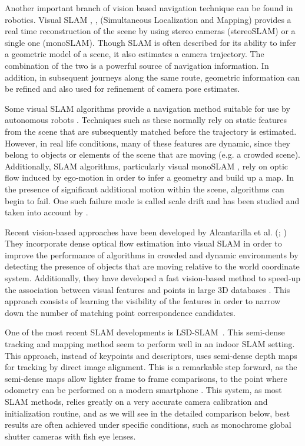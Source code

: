 Another important branch of vision based navigation technique can be found in robotics. Visual SLAM \citep{konolige2007frame}, \citep{engelhard2011real},\citep{neira2008guest} (Simultaneous Localization and Mapping) provides a real time reconstruction of the scene by using stereo cameras (stereoSLAM) or a single one (monoSLAM). Though SLAM is often described for its ability to infer a geometric model of a scene, it also estimates a camera trajectory.  The combination of the two is a powerful source of navigation information. In addition, in subsequent journeys along the same route, geometric information can be refined and also used for refinement of camera pose estimates.

Some visual SLAM algorithms provide a navigation method suitable for use by autonomous robots \citep{konolige2007frame}. Techniques such as these normally rely on static features from the scene that are subsequently matched before the trajectory is estimated. However, in real life conditions, many of these features are dynamic, since they belong to objects or elements of the scene that are moving (e.g. a crowded scene). Additionally, SLAM algorithms, particularly visual monoSLAM \citep{davison2007monoslam}, rely on optic flow induced by ego-motion in order to infer a geometry and build up a map. In the presence of significant additional motion within the scene, algorithms can begin to fail.  One such failure mode is called scale drift and has been studied and taken into account by \cite{strasdat2010scale}. 

Recent vision-based approaches have been developed by Alcantarilla et al. (\citeyear{alcantarilla2010visual}; \citeyear{alcantarilla2012combining}) They incorporate dense optical flow estimation into visual SLAM in order to improve the performance of algorithms in crowded and dynamic environments by detecting the presence of objects that are moving relative to the world coordinate system. Additionally, they have developed a fast vision-based method to speed-up the association between visual features and points in large 3D databases \citep{alcantarilla2010learning}. This approach consists of learning the visibility of the features in order to narrow down the number of matching point correspondence candidates.

One of the most recent SLAM developments is LSD-SLAM~\citep{engel14eccv}. This semi-dense tracking and mapping method seem to perform well in an indoor SLAM setting. This approach, instead of keypoints and descriptors, uses semi-dense depth maps for tracking by direct image alignment. This is a remarkable step forward, as the semi-dense maps allow lighter frame to frame comparisons, to the point where odometry can be performed on a modern smartphone \citep{schoeps14ismar}. This system, as most SLAM methods, relies greatly on a very accurate camera calibration and initialization routine, and as we will see in the detailed comparison below, best results are often achieved under specific conditions, such as monochrome global shutter cameras with fish eye lenses.

